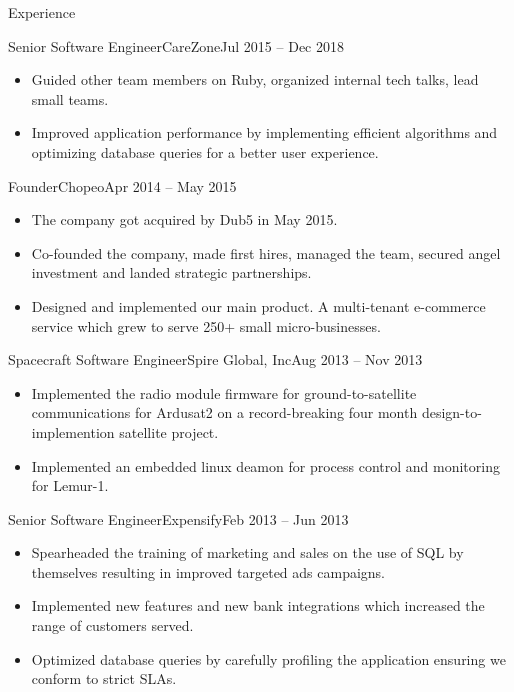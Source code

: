 \documentclass{mcdowellcv}
\begin{document}
\begin{cvsection}{Experience}
\begin{cvsubsection}{Senior Software Engineer}{CareZone}{Jul 2015 -- Dec 2018}
\begin{itemize}
      application, physical pharmacy and warehouse to power an online pharmacy store.
    \item Guided other team members on Ruby, organized internal tech talks, lead
      small teams.
    \item Improved application performance by implementing efficient algorithms
      and optimizing database queries for a better user experience.
		\end{itemize}
	\end{cvsubsection}
	\begin{cvsubsection}{Founder}{Chopeo}{Apr 2014 -- May 2015}
		\begin{itemize}
    \item The company got acquired by Dub5 in May 2015.
    \item Co-founded the company, made first hires, managed the team, secured
      angel investment and landed strategic partnerships.
    \item Designed and implemented our main product. A multi-tenant e-commerce service
      which grew to serve 250+ small micro-businesses.
		\end{itemize}
	\end{cvsubsection}
	\begin{cvsubsection}{Spacecraft Software Engineer}{Spire Global, Inc}{Aug 2013 -- Nov 2013}
		\begin{itemize}%
    \item Implemented the radio module firmware for ground-to-satellite
      communications for Ardusat2 on a record-breaking four month
      design-to-implemention satellite project.
    \item Implemented an embedded linux deamon for process control and
      monitoring for Lemur-1.
		\end{itemize}
	\end{cvsubsection}
	\begin{cvsubsection}{Senior Software Engineer}{Expensify}{Feb 2013 -- Jun 2013}
		\begin{itemize}%
    \item Spearheaded the training of marketing and sales on the use of SQL by
      themselves resulting in improved targeted ads campaigns.
    \item Implemented new features and new bank integrations which increased the
      range of customers served.
    \item Optimized database queries by carefully profiling the application
      ensuring we conform to strict SLAs.

\end{itemize}
\end{cvsubsection}
\end{cvsection}
\end{document}
